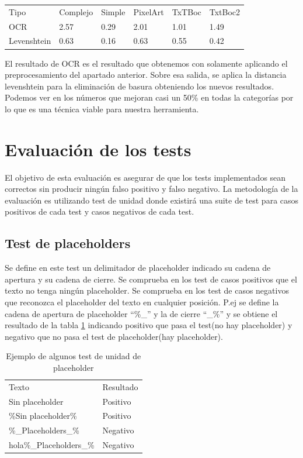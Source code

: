 \begin{table}[H]
\begin{tabular}{llllll}
Tipo        & Complejo & Simple & PixelArt & TxTBoc & TxtBoc2                      \\
OCR         & 2.57     & 0.29   & 2.01     & 1.01   & \cellcolor[HTML]{FFFFFF}1.49 \\
Levenshtein & 0.63     & 0.16   & 0.63     & 0.55   & 0.42                        
\end{tabular}
\end{table}
El resultado de OCR es el resultado que obtenemos con solamente aplicando el preprocesamiento del apartado anterior. Sobre esa salida, se aplica la distancia levenshtein para la eliminación de basura obteniendo los nuevos resultados. Podemos ver en los números que mejoran casi un 50\% en todas la categorías por lo que es una técnica viable para nuestra herramienta.
\section{Evaluación de los tests}
El objetivo de esta evaluación es asegurar de que los tests implementados sean correctos sin producir ningún falso positivo y falso negativo.
La metodología de la evaluación es utilizando test de unidad donde existirá una suite de test para casos positivos de cada test y casos negativos de cada test. 
\subsection{Test de placeholders}
Se define en este test un delimitador de placeholder indicado su cadena de apertura y su cadena de cierre. Se comprueba en los test de casos positivos que el texto no tenga ningún placeholder. Se comprueba en los test de casos negativos que reconozca el placeholder del texto en cualquier posición. P.ej se define la cadena de apertura de placeholder ``\%\_'' y la de cierre ``\_\%'' y se obtiene el resultado de la tabla \ref{table:tu_p} indicando positivo que pasa el test(no hay placeholder) y negativo que no pasa el test de placeholder(hay placeholder).
\begin{table}[H]
	\centering
	\begin{tabular}{ll}
	Texto & Resultado \\
	Sin placeholder & Positivo \\
	\%Sin placeholder\% & Positivo \\
	\%\_Placeholders\_\% & Negativo \\
	hola\%\_Placeholders\_\% & Negativo \\
	\end{tabular}
	\caption{Ejemplo de algunos test de unidad de placeholder}
	\label{table:tu_p}
\end{table}
